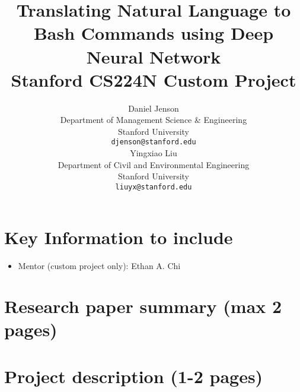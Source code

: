 \documentclass{article}
\title{
	Translating Natural Language to Bash Commands using Deep Neural Network\\
	\vspace{1em}
	\small{\normalfont Stanford CS224N Custom Project}  %
}
\author{
	Daniel Jenson \\
	Department of Management Science \& Engineering \\
	Stanford University \\
	\texttt{djenson@stanford.edu} \\
	\And
	Yingxiao Liu \\
	Department of Civil and Environmental Engineering \\
	Stanford University \\
	\texttt{liuyx@stanford.edu} \\
}
\begin{document}
\maketitle



\section{Key Information to include}

\begin{itemize}
	\item Mentor (custom project only): Ethan A. Chi
\end{itemize}


\section{Research paper summary (max 2 pages)}

\section{Project description (1-2 pages)}




\end{document}
